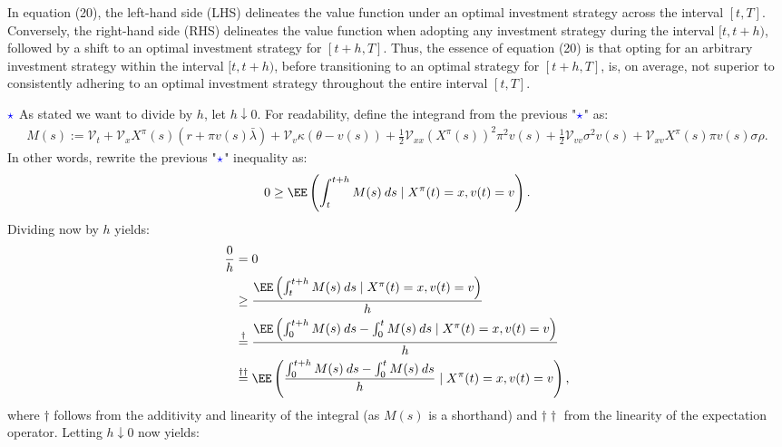 \documentclass[11pt]{article}
\numberwithin{equation}{section}
\begin{document}
In equation (20), the left-hand side (LHS) delineates the value function under
an optimal investment strategy across the interval $[t, T]$. Conversely, the
right-hand side (RHS) delineates the value function when adopting any investment
strategy during the interval $[t, t + h)$, followed by a shift to an optimal
investment strategy for $[t + h, T]$. Thus, the essence of equation (20) is
that opting for an arbitrary investment strategy within the interval $[t, t+h)$,
before transitioning to an optimal strategy for $[t+h, T]$, is, on average, not
superior to consistently adhering to an optimal investment strategy throughout
the entire interval $[t, T]$.

$\textcolor{blue}{\star}$ As stated we want to divide by $h$, let $h\downarrow 0$. For
readability, define the integrand from the previous "$\textcolor{blue}{\star}$" as:
\begin{align*}
    M(s):=\mathcal{V}_t + \mathcal{V}_{x}  X^\pi(s)\left( r + \pi v(s) \bar{\lambda} \right) + \mathcal{V}_v \kappa \left( \theta - v(s) \right) + \frac{1}{2} \mathcal{V}_{xx}( X^\pi(s))^2 \pi^2 v(s) + \frac{1}{2} \mathcal{V}_{vv} \sigma^2 v(s) + \mathcal{V}_{xv} X^\pi(s) \pi v(s) \sigma \rho.
\end{align*}
In other words, rewrite the previous "$\textcolor{blue}{\star}$" inequality as:
\begin{align*}
    0\geq \EE \left ( \int_t^{t+h}M(s)\:ds \mid X^\pi(t)=x,v(t)=v \right ).
\end{align*}
Dividing now by $h$ yields:
\begin{align*}
    \frac{0}{h}&=0\\
    &\geq \frac{\EE \left ( \int_t^{t+h}M(s)\:ds \mid X^\pi(t)=x,v(t)=v \right )}{h}\\
    &\overset{\dagger}{=}\frac{\EE \left ( \int_0^{t+h}M(s)\:ds-\int_0^{t}M(s)\:ds \mid X^\pi(t)=x,v(t)=v \right )}{h}\\
    &\overset{\dagger\dagger}{=}\EE \left ( \frac{\int_0^{t+h}M(s)\:ds-\int_0^{t}M(s)\:ds}{h} \mid X^\pi(t)=x,v(t)=v \right ),
\end{align*}
where $\dagger$ follows from the additivity and linearity of the integral (as
$M(s)$ is a shorthand) and $\dagger \dagger$
from the linearity of the expectation operator.
Letting $h\downarrow 0$ now yields:
\end{document}
